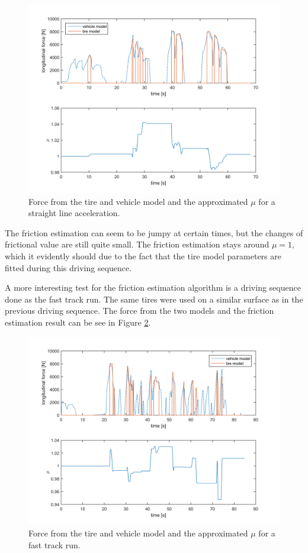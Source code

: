 \begin{figure}[h]
	\centering
	\includegraphics[width=1.0\textwidth]{Pictures/force_mue_olika_acc}
	\caption {Force from the tire and vehicle model and the approximated $ \mu $ for a straight line acceleration.}
	\label{force_mue_olika_acc}
\end{figure}

The friction estimation can seem to be jumpy at certain times, but the changes of frictional value are still quite small. The friction estimation stays around $ \mu = 1 $, which it evidently should due to the fact that the tire model parameters are fitted during this driving sequence.  

A more interesting test for the friction estimation algorithm is a driving sequence done as the fast track run. The same tires were used on a similar surface as in the previous driving sequence. The force from the two models and the friction estimation result can be see in Figure \ref{force_mue_race}. 

\begin{figure}[h]
	\centering
	\includegraphics[width=1.0\textwidth]{Pictures/force_mue_race}
	\caption {Force from the tire and vehicle model and the approximated $ \mu $ for a fast track run.}
	\label{force_mue_race}
\end{figure}

